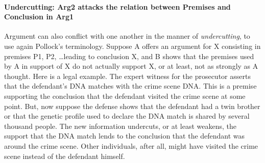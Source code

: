 \documentclass[10pt]{article}
\begin{document}

\paragraph{	Undercutting: Arg2 attacks the relation between Premises and Conclusion in Arg1}

Argument can also conflict with one another in the manner of \textit{undercutting}, 
to use again Pollock's terminology. Suppose A offers an argument for X consisting in premises 
P1, P2, \dots leading to conclusion X, and B shows that the premises used by A in support of X 
do not actually support X, or at least, not as strongly as A thought. 
 Here is  a legal example. The expert witness for the prosecutor asserts that the defendant's 
 DNA matches with the crime scene DNA. This is a premise supporting the conclusion that 
 the defendant visited the crime scene at some point. But, now suppose the defense shows that  
 the defendant had a twin brother or that the genetic profile used to declare the DNA match is shared by several thousand 
 people.  The new information undercuts, or at least weakens, the support that the DNA match lends 
 to the conclusion that the defendant was around the crime scene. Other individuals, after all, might have visited 
 the crime scene instead of the defendant himself.
\end{document}
